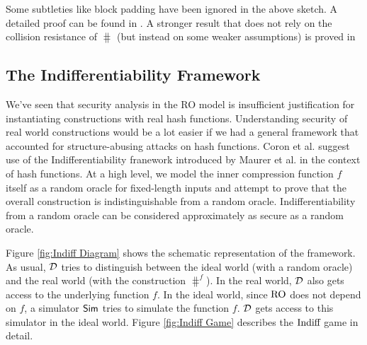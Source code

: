 \noindent Some subtleties like block padding have been ignored in the above sketch. A detailed proof can be found in \cite{Bellare1996}. A stronger result that does not rely on the collision resistance of $\hash$ (but instead on some weaker assumptions) is proved in \cite{Bellare2006}

\subsection{The Indifferentiability Framework}
We've seen that security analysis in the RO model is insufficient justification for instantiating constructions with real hash functions. Understanding security of real world constructions would be a lot easier if we had a general framework that accounted for structure-abusing attacks on hash functions. Coron et al. \cite{Coron2005} suggest use of the Indifferentiability franework introduced by Maurer et al. \cite{Maurer2004} in the context of hash functions. At a high level, we model the inner compression function $f$ itself as a random oracle for fixed-length inputs and attempt to prove that the overall construction is indistinguishable from a random oracle. Indifferentiability from a random oracle can be considered approximately as secure as a random oracle. 

Figure \ref{fig:Indiff Diagram} shows the schematic representation of the framework. As usual, ${\mathcal D}$ tries to distinguish between the ideal world (with a random oracle) and the real world (with the construction $\hash^f$). In the real world, ${\mathcal D}$ also gets access to the underlying function $f$. In the ideal world, since $\textnormal{RO}$ does not depend on $f$, a simulator $\textsf{Sim}$ tries to simulate the function $f$. ${\mathcal D}$ gets access to this simulator in the ideal world. Figure \ref{fig:Indiff Game} describes the $\textnormal{Indiff}$ game in detail.


